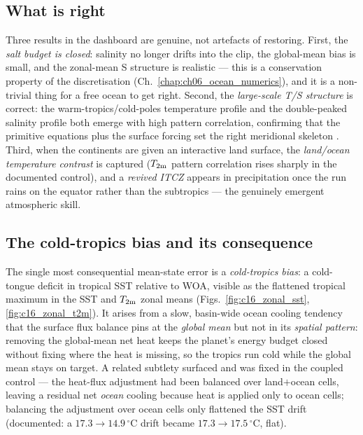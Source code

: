 \subsection{What is right}

Three results in the dashboard are genuine, not artefacts of restoring. First,
the \emph{salt budget is closed}: salinity no longer drifts into the clip, the
global-mean bias is small, and the zonal-mean S structure is realistic --- this
is a conservation property of the discretisation
(Ch.~\ref{chap:ch06_ocean_numerics}), and it is a non-trivial thing for a free
ocean to get right. Second, the \emph{large-scale T/S structure} is correct: the
warm-tropics/cold-poles temperature profile and the double-peaked salinity
profile both emerge with high pattern correlation, confirming that the primitive
equations plus the surface forcing set the right meridional skeleton
\citep{vallis2017,griffies2004}. Third, when the continents are given an
interactive land surface, the \emph{land/ocean temperature contrast} is captured
($T_{2\mathrm{m}}$ pattern correlation rises sharply in the documented control), and a
\emph{revived ITCZ} appears in precipitation once the run rains on the equator
rather than the subtropics --- the genuinely emergent atmospheric skill.

\subsection{The cold-tropics bias and its consequence}

The single most consequential mean-state error is a \emph{cold-tropics bias}: a
cold-tongue deficit in tropical SST relative to WOA, visible as the flattened
tropical maximum in the SST and $T_{2\mathrm{m}}$ zonal means
(Figs.~\ref{fig:c16_zonal_sst}, \ref{fig:c16_zonal_t2m}). It arises from a
slow, basin-wide ocean cooling tendency that the surface flux balance pins at the
\emph{global mean} but not in its \emph{spatial pattern}: removing the global-mean
net heat keeps the planet's energy budget closed without fixing where the heat
is missing, so the tropics run cold while the global mean stays on target. A
related subtlety surfaced and was fixed in the coupled control --- the heat-flux
adjustment had been balanced over land$+$ocean cells, leaving a residual net
\emph{ocean} cooling because heat is applied only to ocean cells; balancing the
adjustment over ocean cells only flattened the SST drift (documented: a
$17.3\to14.9\,^\circ$C drift became $17.3\to17.5\,^\circ$C, flat).

